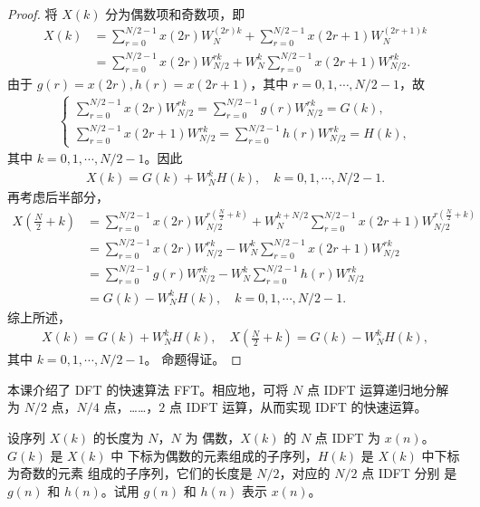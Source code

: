 \begin{proof}
    将 $X(k)$ 分为偶数项和奇数项，即
    \begin{align*}
        X(k) & = \sum_{r = 0}^{N/2 - 1}x(2r)W_N^{(2r)k}
            + \sum_{r = 0}^{N/2 - 1}x(2r + 1)W_N^{(2r + 1)k} \\
        & = \sum_{r = 0}^{N/2 - 1}x(2r)W_{N/2}^{rk}
            + W_N^k\sum_{r = 0}^{N/2 - 1}x(2r + 1)W_{N/2}^{rk}.
    \end{align*}
    由于 $g(r) = x(2r), h(r) = x(2r + 1)$，其中 $r = 0, 1, \cdots, N/2 - 1$，故
    \begin{align*}
        \begin{cases}
            \sum_{r = 0}^{N/2 - 1}x(2r)W_{N/2}^{rk}
                = \sum_{r = 0}^{N/2 - 1}g(r)W_{N/2}^{rk} = G(k), \\
            \sum_{r = 0}^{N/2 - 1}x(2r + 1)W_{N/2}^{rk}
                = \sum_{r = 0}^{N/2 - 1}h(r)W_{N/2}^{rk} = H(k),
        \end{cases}
    \end{align*}
    其中 $k = 0, 1, \cdots, N/2 - 1$。因此
    \begin{align*}
        X(k) = G(k) + W_N^kH(k), \quad k = 0, 1, \cdots, N/2 - 1.
    \end{align*}
    再考虑后半部分，
    \begin{align*}
        X\left(\frac{N}{2} + k\right) & = \sum_{r = 0}^{N/2 - 1}x(2r)W_{N/2}^{r\left(\frac{N}{2} + k\right)}
            + W_N^{k + N/2}\sum_{r = 0}^{N/2 - 1}x(2r + 1)W_{N/2}^{r\left(\frac{N}{2} + k\right)} \\
        & = \sum_{r = 0}^{N/2 - 1}x(2r)W_{N/2}^{rk}
            - W_N^k\sum_{r = 0}^{N/2 - 1}x(2r + 1)W_{N/2}^{rk} \\
        & = \sum_{r = 0}^{N/2 - 1}g(r)W_{N/2}^{rk}
            - W_N^k\sum_{r = 0}^{N/2 - 1}h(r)W_{N/2}^{rk} \\
        & = G(k) - W_N^kH(k), \quad k = 0, 1, \cdots, N/2 - 1.
    \end{align*}
    综上所述，
    \begin{align*}
        X(k) = G(k) + W_N^kH(k), \quad X\left(\frac{N}{2} + k\right) = G(k) - W_N^kH(k),
    \end{align*}
    其中 $k = 0, 1, \cdots, N/2 - 1$。
    命题得证。
\end{proof}

\begin{homework}
    本课介绍了 DFT 的快速算法 FFT。相应地，可将 $N$ 点 IDFT 运算递归地分解
    为 $N/2$ 点，$N/4$ 点，……，$2$ 点 IDFT 运算，从而实现 IDFT 的快速运算。

    设序列 $X(k)$ 的长度为 $N$，$N$ 为
    偶数，$X(k)$ 的 $N$ 点 IDFT 为 $x(n)$。$G(k)$ 是 $X(k)$ 中
    下标为偶数的元素组成的子序列，$H(k)$ 是 $X(k)$ 中下标为奇数的元素
    组成的子序列，它们的长度是 $N/2$，对应的 $N/2$ 点 IDFT 分别
    是 $g(n)$ 和 $h(n)$。试用 $g(n)$ 和 $h(n)$ 表示 $x(n)$。
\end{homework}

